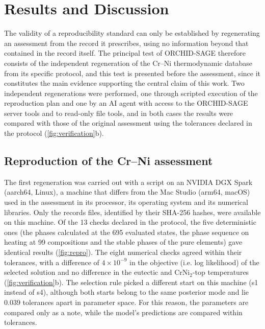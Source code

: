 \section{Results and Discussion}
\label{sec:results-and-discussion}

The validity of a reproducibility standard can only be established by regenerating an assessment from the record it prescribes, using no information beyond that contained in the record itself. The principal test of ORCHID-SAGE therefore consists of the independent regeneration of the Cr--Ni thermodynamic database from its specific protocol, and this test is presented before the assessment, since it constitutes the main evidence supporting the central claim of this work. Two independent regenerations were performed, one through scripted execution of the reproduction plan and one by an AI agent with access to the ORCHID-SAGE server tools and to read-only file tools, and in both cases the results were compared with those of the original assessment using the tolerances declared in the protocol (\cref{fig:verification}b).

\subsection{Reproduction of the Cr--Ni assessment}
\label{sec:reproduction}

The first regeneration was carried out with a script on an NVIDIA DGX Spark (aarch64, Linux), a machine that differs from the Mac Studio (arm64, macOS) used in the assessment in its processor, its operating system and its numerical libraries. Only the records files, identified by their SHA-256 hashes, were available on this machine. Of the 13 checks declared in the protocol, the five deterministic ones (the phases calculated at the 695 evaluated states, the phase sequence on heating at 99 compositions and the stable phases of the pure elements) gave identical results (\cref{fig:repro}). The eight numerical checks agreed within their tolerances, with a difference of $4 \times 10^{-9}$ in the objective (i.e. log likelihood) of the selected solution and no difference in the eutectic and CrNi$_2$-top temperatures (\cref{fig:verification}b). The selection rule picked a different start on this machine (s1 instead of s4), although both starts belong to the same posterior mode and lie 0.039 tolerances apart in parameter space. For this reason, the parameters are compared only as a note, while the model's predictions are compared within tolerances.

